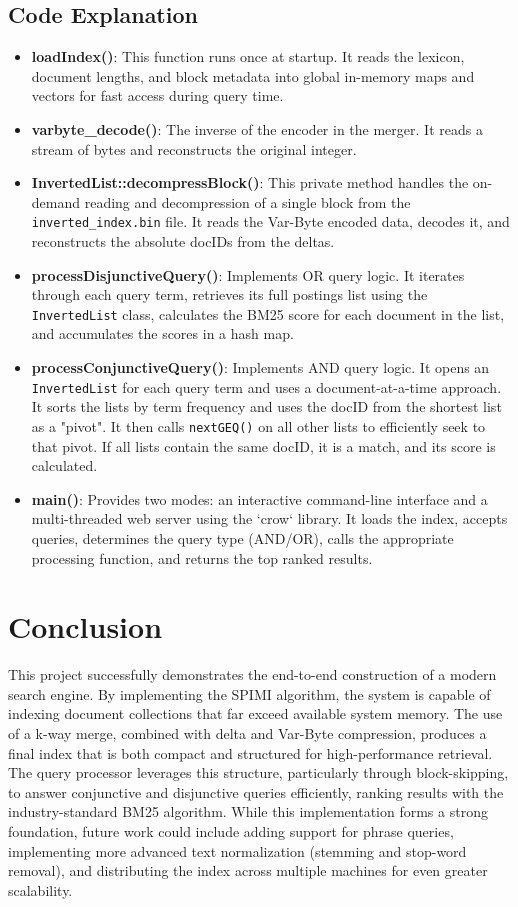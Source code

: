 \documentclass{article}
\begin{document}
\subsection{Code Explanation}
\begin{itemize}
    \item \textbf{loadIndex()}: This function runs once at startup. It reads the lexicon, document lengths, and block metadata into global in-memory maps and vectors for fast access during query time.
    \item \textbf{varbyte\_decode()}: The inverse of the encoder in the merger. It reads a stream of bytes and reconstructs the original integer.
    \item \textbf{InvertedList::decompressBlock()}: This private method handles the on-demand reading and decompression of a single block from the \texttt{inverted\_index.bin} file. It reads the Var-Byte encoded data, decodes it, and reconstructs the absolute docIDs from the deltas.
    \item \textbf{processDisjunctiveQuery()}: Implements OR query logic. It iterates through each query term, retrieves its full postings list using the \texttt{InvertedList} class, calculates the BM25 score for each document in the list, and accumulates the scores in a hash map.
    \item \textbf{processConjunctiveQuery()}: Implements AND query logic. It opens an \texttt{InvertedList} for each query term and uses a document-at-a-time approach. It sorts the lists by term frequency and uses the docID from the shortest list as a "pivot". It then calls \texttt{nextGEQ()} on all other lists to efficiently seek to that pivot. If all lists contain the same docID, it is a match, and its score is calculated.
    \item \textbf{main()}: Provides two modes: an interactive command-line interface and a multi-threaded web server using the `crow` library. It loads the index, accepts queries, determines the query type (AND/OR), calls the appropriate processing function, and returns the top ranked results.
\end{itemize}

\section{Conclusion}
This project successfully demonstrates the end-to-end construction of a modern search engine. By implementing the SPIMI algorithm, the system is capable of indexing document collections that far exceed available system memory. The use of a k-way merge, combined with delta and Var-Byte compression, produces a final index that is both compact and structured for high-performance retrieval. The query processor leverages this structure, particularly through block-skipping, to answer conjunctive and disjunctive queries efficiently, ranking results with the industry-standard BM25 algorithm. While this implementation forms a strong foundation, future work could include adding support for phrase queries, implementing more advanced text normalization (stemming and stop-word removal), and distributing the index across multiple machines for even greater scalability.
\end{document}
